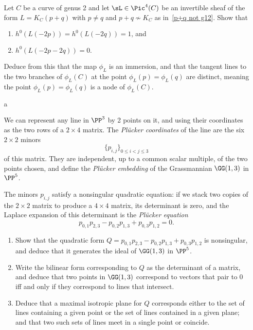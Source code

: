  
\begin{exercise}\label{nodal quartic}
Let $C$ be a  curve of genus 2 and let $\sL\in \Pic^4(C)$ be an invertible sheaf of the form $L = K_C(p+q)$ with $p \neq q$ and $p+q \not\sim K_C$ as in~\ref{p+q not g12}. Show that
\begin{enumerate}
\item $h^0(L(-2p)) = h^0(L(-2q)) = 1$, and
\item $h^0(L(-2p-2q)) = 0$.
\end{enumerate}
Deduce from this that the map $\phi_L$ is an immersion, and that the tangent lines to the two branches of $\phi_L(C)$ at the point $\phi_L(p) = \phi_L(q)$ are distinct, meaning the point $\phi_L(p) = \phi_L(q)$ is a node of $\phi_L(C)$.

a\end{exercise}


 
 
\begin{exercise}\label{G13}
We can represent any line in $\PP^3$ by 2 points on it, and using their coordinates as the two rows of a 
$2\times 4$ matrix. The \emph{Pl\"ucker coordinates} of the line are the six $2\times 2$ minors
$$
\{p_{i,j}\}_{0\leq i<j\leq 3}
$$
of this matrix. They are independent, up to a common scalar multiple, of the two points chosen, and define the \emph{Pl\"ucker embedding} of the Grassmannian $\GG(1,3)$ in $\PP^5$.

The minors $p_{i,j}$  satisfy a nonsingular quadratic equation: if we stack two copies of the $2\times 2$
matrix to produce a $4\times 4$ matrix, its determinant is zero, and the Laplace expansion of this determinant
is the \emph{Pl\"ucker equation}
$$
p_{0,1}p_{2,3}-p_{0,2}p_{1,3}+p_{0,3}p_{1,2} = 0.
$$

\begin{enumerate}
\item Show that the quadratic form
$
Q = p_{0,1}p_{2,3}-p_{0,2}p_{1,3}+p_{0,3}p_{1,2}
$
is nonsingular, and deduce that it generates the ideal of $\GG(1,3)$ in $\PP^5$.
\item
Write the bilinear form corresponding to $Q$ as the determinant of a matrix, and deduce that 
two points in $\GG(1,3)$ correspond to vectors that pair to 0 iff and only if they correspond to lines that intersect.
\item Deduce that a maximal isotropic plane for $Q$ corresponds either to the set of lines containing a given point or the set of lines contained in a given plane; and that two such sets of lines meet in a single point or coincide.
\end{enumerate}
\end{exercise}





